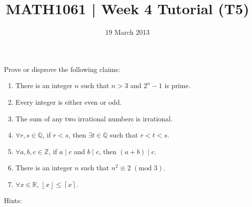 \documentclass[a4paper,12pt]{article}
\newcommand{\floor}[1]{\left\lfloor #1 \right\rfloor}
\newcommand{\ceil}[1]{\left\lceil #1 \right\rceil}
\begin{document}
\pagestyle{myheadings}

\title{MATH1061 | Week 4 Tutorial (T5)}
\date{19 March 2013}
\maketitle

Prove or disprove the following claims:

\begin{enumerate}
\item There is an integer $n$ such that $n > 3$ and $2^n - 1$ is prime.
\item Every integer is either even or odd.
\item The sum of any two irrational numbers is irrational.
\item $\forall r, s \in \mathbb{Q}$, if $r < s$, then $\exists t \in \mathbb{Q}$ such that $r < t < s$.
\item $\forall a, b, c \in \mathbb{Z}$, if $a \mid c$ and $b \mid c$, then $(a + b) \mid c$.
\item There is an integer $n$ such that $n^2 \equiv 2 \; (\text{mod } 3)$.
\item $\forall x \in \mathbb{R}$, $\floor{x} \leq \ceil{x}$.
\end{enumerate}

\newpage

Hints:
\end{document}
